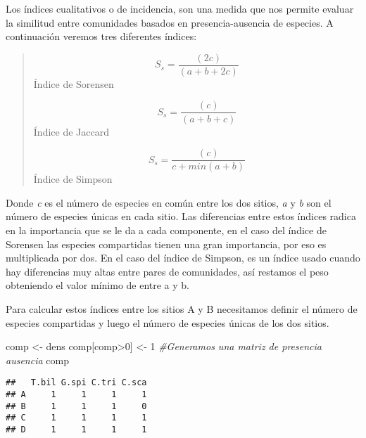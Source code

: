 \documentclass[
]{article}
\newenvironment{Shaded}{\begin{snugshade}}{\end{snugshade}}
\newcommand{\CommentTok}[1]{\textcolor[rgb]{0.56,0.35,0.01}{\textit{#1}}}
\newcommand{\DecValTok}[1]{\textcolor[rgb]{0.00,0.00,0.81}{#1}}
\newcommand{\NormalTok}[1]{#1}
\newcommand{\OtherTok}[1]{\textcolor[rgb]{0.56,0.35,0.01}{#1}}
\newcommand{\SpecialCharTok}[1]{\textcolor[rgb]{0.00,0.00,0.00}{#1}}
\begin{document}
Los índices cualitativos o de incidencia, son una medida que nos permite evaluar la similitud entre comunidades basados en presencia-ausencia de especies. A continuación veremos tres diferentes índices:

\begin{quote}
\[S_s= \frac{(2c)}{(a+b+2c)}\]
Índice de Sorensen

\[S_s= \frac{(c)}{(a+b+c)}\]
Índice de Jaccard

\[S_s= \frac{(c)}{c+min(a+b)}\]
Índice de Simpson
\end{quote}

Donde \emph{c} es el número de especies en común entre los dos sitios, \emph{a} y \emph{b} son el número de especies únicas en cada sitio. Las diferencias entre estos índices radica en la importancia que se le da a cada componente, en el caso del índice de Sorensen las especies compartidas tienen una gran importancia, por eso es multiplicada por dos. En el caso del índice de Simpson, es un índice usado cuando hay diferencias muy altas entre pares de comunidades, así restamos el peso obteniendo el valor mínimo de entre a y b.

Para calcular estos índices entre los sitios A y B necesitamos definir el número de especies compartidas y luego el número de especies únicas de los dos sitios.

\begin{Shaded}
\begin{Highlighting}[]
\NormalTok{comp }\OtherTok{\textless{}{-}}\NormalTok{ dens}
\NormalTok{comp[comp}\SpecialCharTok{\textgreater{}}\DecValTok{0}\NormalTok{] }\OtherTok{\textless{}{-}} \DecValTok{1} \CommentTok{\#Generamos una matriz de presencia ausencia}
\NormalTok{comp}
\end{Highlighting}
\end{Shaded}

\begin{verbatim}
##   T.bil G.spi C.tri C.sca
## A     1     1     1     1
## B     1     1     1     0
## C     1     1     1     1
## D     1     1     1     1
\end{verbatim}
\end{document}
